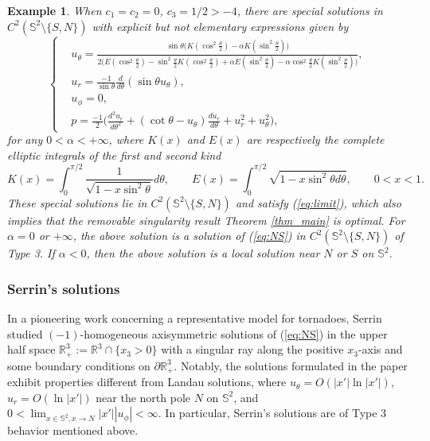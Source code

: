 \documentclass[12pt]{article}
\newtheorem{example}{Example}[section]
\begin{document}
\begin{example}
	When $c_1=c_2=0$, $c_3=1/2>-4$, there are special solutions in $C^2(\mathbb{S}^2\setminus\{S, N\})$ with explicit but not elementary expressions given by
	\[
	\left\{
	\begin{aligned}
		& u_\theta = \frac{ \sin\theta \big( K( \cos^2\frac{\theta}{2} ) - \alpha K( \sin^2\frac{\theta}{2} ) \big) }{2 \big( E( \cos^2\frac{\theta}{2} ) - \sin^2\frac{\theta}{2} K( \cos^2\frac{\theta}{2} ) + \alpha E( \sin^2\frac{\theta}{2} ) - \alpha \cos^2\frac{\theta}{2} K( \sin^2\frac{\theta}{2} ) \big) }, \\
		& u_r = \frac{-1}{\sin\theta}\frac{d}{d\theta}(\sin\theta u_\theta), \\
		& u_\phi = 0, \\
		& p = \frac{-1}{2} \Big( \frac{d^2 u_r}{d\theta^2} + (\cot\theta-u_\theta) \frac{d u_r}{d\theta} + u_r^2 +u_\theta^2 \Big), 
	\end{aligned}
	\right.
	\]
	for any $0<\alpha <+\infty$, where $K(x)$ and $E(x)$ are respectively the complete elliptic integrals of the first and second kind
	\[
		K(x) = \int_0^{\pi/2} \frac{1}{\sqrt{1-x \sin^2\theta} } d \theta, \qquad 
		E(x) = \int_0^{\pi/2} \sqrt{1-x \sin^2\theta d\theta}, \qquad 0<x<1. 
	\]
	These special solutions lie in $C^2(\mathbb{S}^2\setminus\{S, N\})$ and satisfy (\ref{eq:limit}), which also implies that the removable singularity result Theorem \ref{thm_main} is optimal. For $\alpha=0$ or $+\infty$, the above solution is a solution of (\ref{eq:NS}) in $C^2(\mathbb{S}^2\setminus\{S, N\})$ of Type 3. If $\alpha<0$, then the above solution is a local solution near $N$ or $S$ on $\mathbb{S}^2$. 
\end{example}

\subsubsection{Serrin's solutions}

In a pioneering work \cite{Serrin} concerning a representative model for tornadoes, Serrin studied $(-1)$-homogeneous axisymmetric solutions of (\ref{eq:NS}) in the upper half space $\mathbb{R}^3_+:=\mathbb{R}^3\cap\{x_3>0\}$ with a singular ray along the positive $x_3$-axis and some boundary conditions on $\partial \mathbb{R}^3_+$. Notably, the solutions formulated in the paper exhibit properties different from Landau solutions, where $u_{\theta}=O(|x'| \ln |x'|)$, $u_r=O(\ln |x'|)$ near the north pole $N$ on $\mathbb{S}^2$, and $0<\lim_{x\in \mathbb{S}^2, x\to N}|x'| |u_{\phi}|<\infty$. In particular, Serrin's solutions are of Type 3 behavior mentioned above. 
\end{document}
